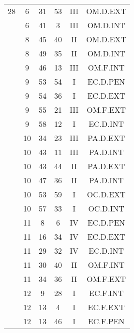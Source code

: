 \documentclass[12pt, a4paper]{article}
\begin{document}
\begin{multicols}{3}
{\begin{tabular}{c c c c c c}
	 	 	 	28 & 6 & 31 & 53 & III & OM.D.EXT\\%
	 	 	 	 & 6 & 41 & 3 & III & OM.D.INT\\%
	 	 	 	 & 8 & 45 & 40 & II & OM.D.EXT\\%
	 	 	 	 & 8 & 49 & 35 & II & OM.D.INT\\%
	 	 	 	 & 9 & 46 & 13 & III & OM.F.INT\\%
	 	 	 	 & 9 & 53 & 54 & I & EC.D.PEN\\%
	 	 	 	 & 9 & 54 & 36 & I & EC.D.EXT\\%
	 	 	 	 & 9 & 55 & 21 & III & OM.F.EXT\\%
	 	 	 	 & 9 & 58 & 12 & I & EC.D.INT\\%
	 	 	 	 & 10 & 34 & 23 & III & PA.D.EXT\\%
	 	 	 	 & 10 & 43 & 11 & III & PA.D.INT\\%
	 	 	 	 & 10 & 43 & 44 & II & PA.D.EXT\\%
	 	 	 	 & 10 & 47 & 36 & II & PA.D.INT\\%
	 	 	 	 & 10 & 53 & 59 & I & OC.D.EXT\\%
	 	 	 	 & 10 & 57 & 33 & I & OC.D.INT\\%
	 	 	 	 & 11 & 8 & 6 & IV & EC.D.PEN\\%
	 	 	 	 & 11 & 16 & 34 & IV & EC.D.EXT\\%
	 	 	 	 & 11 & 29 & 32 & IV & EC.D.INT\\%
	 	 	 	 & 11 & 30 & 40 & II & OM.F.INT\\%
	 	 	 	 & 11 & 34 & 36 & II & OM.F.EXT\\%
	 	 	 	 & 12 & 9 & 28 & I & EC.F.INT\\%
	 	 	 	 & 12 & 13 & 4 & I & EC.F.EXT\\%
	 	 	 	 & 12 & 13 & 46 & I & EC.F.PEN\\%

\end{tabular}}
\end{multicols}
\end{document}
